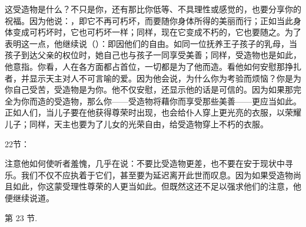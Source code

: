 这受造物是什么？不只是你，还有那比你低等、不具理性或感觉的，也要分享你的祝福。因为他说：，即它不再可朽坏，而要随你身体所得的美丽而行；正如当此身体变成可朽坏时，它也可朽坏一样；同样，现在它变成不朽的，它也要随之。为了表明这一点，他继续说（）：即因他们的自由。如同一位抚养王子孩子的乳母，当孩子到达父亲的权位时，她自己也与孩子一同享受美善；同样，受造物也是如此，他意指。你看，人在各方面都占首位，一切都是为了他而造。看他如何安慰那挣扎者，并显示天主对人不可言喻的爱。因为他会说，为什么你为考验而烦恼？你是为你自己受苦，受造物是为你。他不仅安慰，还显示他的话是可信的。因为如果那完全为你而造的受造物，那么你——受造物将藉你而享受那些美善——更应当如此。正如人们，当儿子要在他获得尊荣时出现，也会给仆人穿上更光亮的衣服，以荣耀儿子；同样，天主也要为了儿女的光荣自由，给受造物穿上不朽的衣服。\par

22节：\par

注意他如何使听者羞愧，几乎在说：不要比受造物更差，也不要在安于现状中寻乐。我们不仅不应执着于它们，甚至要为延迟离开此世而叹息。因为如果受造物尚且如此，你这蒙受理性尊荣的人更当如此。但既然这还不足以强求他们的注意，他便继续说道。\par

第 23 节.  \par

